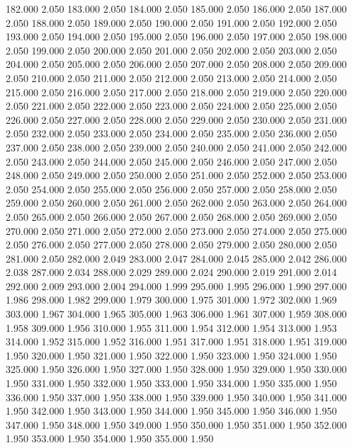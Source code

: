 182.000 2.050 
183.000 2.050 
184.000 2.050 
185.000 2.050 
186.000 2.050 
187.000 2.050 
188.000 2.050 
189.000 2.050 
190.000 2.050 
191.000 2.050 
192.000 2.050 
193.000 2.050 
194.000 2.050 
195.000 2.050 
196.000 2.050 
197.000 2.050 
198.000 2.050 
199.000 2.050 
200.000 2.050 
201.000 2.050 
202.000 2.050 
203.000 2.050 
204.000 2.050 
205.000 2.050 
206.000 2.050 
207.000 2.050 
208.000 2.050 
209.000 2.050 
210.000 2.050 
211.000 2.050 
212.000 2.050 
213.000 2.050 
214.000 2.050 
215.000 2.050 
216.000 2.050 
217.000 2.050 
218.000 2.050 
219.000 2.050 
220.000 2.050 
221.000 2.050 
222.000 2.050 
223.000 2.050 
224.000 2.050 
225.000 2.050 
226.000 2.050 
227.000 2.050 
228.000 2.050 
229.000 2.050 
230.000 2.050 
231.000 2.050 
232.000 2.050 
233.000 2.050 
234.000 2.050 
235.000 2.050 
236.000 2.050 
237.000 2.050 
238.000 2.050 
239.000 2.050 
240.000 2.050 
241.000 2.050 
242.000 2.050 
243.000 2.050 
244.000 2.050 
245.000 2.050 
246.000 2.050 
247.000 2.050 
248.000 2.050 
249.000 2.050 
250.000 2.050 
251.000 2.050 
252.000 2.050 
253.000 2.050 
254.000 2.050 
255.000 2.050 
256.000 2.050 
257.000 2.050 
258.000 2.050 
259.000 2.050 
260.000 2.050 
261.000 2.050 
262.000 2.050 
263.000 2.050 
264.000 2.050 
265.000 2.050 
266.000 2.050 
267.000 2.050 
268.000 2.050 
269.000 2.050 
270.000 2.050 
271.000 2.050 
272.000 2.050 
273.000 2.050 
274.000 2.050 
275.000 2.050 
276.000 2.050 
277.000 2.050 
278.000 2.050 
279.000 2.050 
280.000 2.050 
281.000 2.050 
282.000 2.049 
283.000 2.047 
284.000 2.045 
285.000 2.042 
286.000 2.038 
287.000 2.034 
288.000 2.029 
289.000 2.024 
290.000 2.019 
291.000 2.014 
292.000 2.009 
293.000 2.004 
294.000 1.999 
295.000 1.995 
296.000 1.990 
297.000 1.986 
298.000 1.982 
299.000 1.979 
300.000 1.975 
301.000 1.972 
302.000 1.969 
303.000 1.967 
304.000 1.965 
305.000 1.963 
306.000 1.961 
307.000 1.959 
308.000 1.958 
309.000 1.956 
310.000 1.955 
311.000 1.954 
312.000 1.954 
313.000 1.953 
314.000 1.952 
315.000 1.952 
316.000 1.951 
317.000 1.951 
318.000 1.951 
319.000 1.950 
320.000 1.950 
321.000 1.950 
322.000 1.950 
323.000 1.950 
324.000 1.950 
325.000 1.950 
326.000 1.950 
327.000 1.950 
328.000 1.950 
329.000 1.950 
330.000 1.950 
331.000 1.950 
332.000 1.950 
333.000 1.950 
334.000 1.950 
335.000 1.950 
336.000 1.950 
337.000 1.950 
338.000 1.950 
339.000 1.950 
340.000 1.950 
341.000 1.950 
342.000 1.950 
343.000 1.950 
344.000 1.950 
345.000 1.950 
346.000 1.950 
347.000 1.950 
348.000 1.950 
349.000 1.950 
350.000 1.950 
351.000 1.950 
352.000 1.950 
353.000 1.950 
354.000 1.950 
355.000 1.950 
